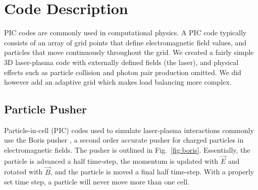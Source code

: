 \documentclass[]{article}
\begin{document}
\section{Code Description}
PIC codes are commonly used in computational physics.  A PIC code typically consists of an array of grid points that define electromagnetic field values, and particles that move continuously throughout the grid.  We created a fairly simple 3D laser-plasma code with externally defined fields (the laser), and physical effects such as particle collision and photon pair production omitted.  We did however add an adaptive grid which makes load balancing more complex.

\subsection{Particle Pusher}
Particle-in-cell (PIC) codes used to simulate laser-plasma interactions commonly use the Boris pusher \cite{bird}, a second order accurate pusher for charged particles in electromagnetic fields.  The pusher is outlined in Fig.~\ref{fig:boris}.  Essentially, the particle is advanced a half time-step, the momentum is updated with $\vec{E}$ and rotated with $\vec{B}$, and the particle is moved a final half time-step.  With a properly set time step, a particle will never move more than one cell.
\end{document}

